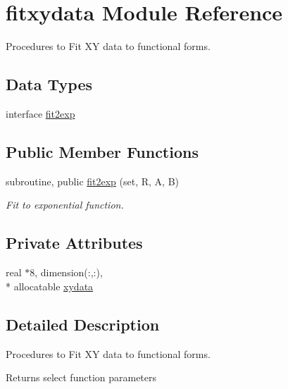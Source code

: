 \hypertarget{classfitxydata}{\section{fitxydata Module Reference}
\label{classfitxydata}
}


Procedures to Fit X\-Y data to functional forms.  


\subsection*{Data Types}
\begin{DoxyCompactItemize}
\item 
interface \hyperlink{interfacefitxydata_1_1fit2exp}{fit2exp}
\end{DoxyCompactItemize}
\subsection*{Public Member Functions}
\begin{DoxyCompactItemize}
\item 
subroutine, public \hyperlink{classfitxydata_a9f00dca017c2372da0c3c95cdf0ddb31}{fit2exp} (set, R, A, B)
\begin{DoxyCompactList}\small\item\em Fit to exponential function. \end{DoxyCompactList}\end{DoxyCompactItemize}
\subsection*{Private Attributes}
\begin{DoxyCompactItemize}
\item 
real $\ast$8, dimension(\-:,\-:), \\*
allocatable \hyperlink{classfitxydata_ad69a6716eab16a1f8c170a0d0a7ed499}{xydata}
\end{DoxyCompactItemize}


\subsection{Detailed Description}
Procedures to Fit X\-Y data to functional forms. 

Returns select function parameters 

